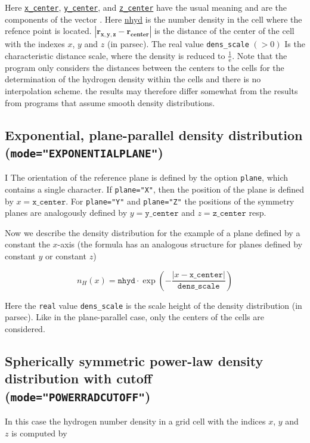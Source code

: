 \documentclass[a4paper,10pt]{article}
\begin{document}
Here \hyperref[hydopt:xcenter]{\texttt{x\_center}}, 
\hyperref[hydopt:ycenter]{\texttt{y\_center}}, 
and \hyperref[hydopt:zcenter]{\texttt{z\_center}} have the 
usual meaning and are the components of the vector $\mathbf{}$. 
Here \hyperref[hydopt:nhyd]{nhyd} is the number density in the cell where the 
refence point is located. 
$\left|\mathbf{r_{x,y,z}} - \mathbf{r_{center}} \right|$ is the
distance of the center of the cell with the indexes $x$, $y$ and $z$ (in 
parsec). The real value \texttt{dens\_scale} $(>0)$ Is the characteristic 
distance scale, where the density is reduced to $\frac{1}{\mathrm{e}}$.
Note that the program only considers the distances between the centers to the 
cells for the determination of the hydrogen density within the cells and there 
is no interpolation scheme. the results may therefore differ somewhat from the 
results from programs that assume smooth density distributions.

\subsection{Exponential, plane-parallel  density distribution\\
(\texttt{mode="EXPONENTIALPLANE"})}
I
The orientation of the reference plane is defined by the option \texttt{plane}, 
which contains a single character. If \texttt{plane="X"}, then the 
position of the plane is defined by $x=\mathtt{x\_center}$. For 
\texttt{plane="Y"} and 
\texttt{plane="Z"} the positions of the symmetry planes are analogously 
defined by  $y=\mathtt{y\_center}$  and  $z=\mathtt{z\_center}$ resp.

Now we describe the density distribution for the example of a plane defined by 
a constant the $x$-axis (the formula has an analogous structure for planes 
defined by constant $y$ or constant $z$)

\begin{equation}
n_H(x) = \mathtt{nhyd} \cdot \exp\left(- 
\frac{\left|x - \mathtt{x\_center} \right|}{\mathtt{dens\_scale}}\right)
\end{equation}

Here the \texttt{real} value \texttt{dens\_scale} is the scale height of the 
density distribution (in parsec).
Like in the plane-parallel case, only the centers of the cells are considered.

\subsection{Spherically symmetric power-law density distribution with cutoff\\ 
(\texttt{mode="POWERRADCUTOFF"})}
In this case the hydrogen number density in a grid cell with the indices $x$, 
$y$ and $z$ is computed by
\end{document}
